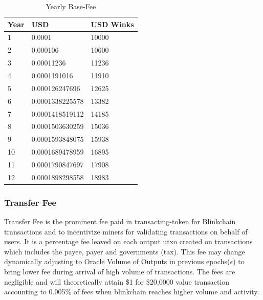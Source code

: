\documentclass[letterpaper,11pt]{article}
\begin{document}
\begin{table}[!ht]
    \centering
    \begin{tabular}{|l|l|l|}
    \hline
        Year & USD  & USD Winks \\ \hline
        1 & 0.0001 & 10000 \\ 
        2 & 0.000106 & 10600 \\ 
        3 & 0.00011236 & 11236 \\ 
        4 & 0.0001191016 & 11910 \\  
        5 & 0.000126247696 & 12625 \\ 
        6 & 0.0001338225578 & 13382 \\ 
        7 & 0.0001418519112 & 14185 \\ 
        8 & 0.0001503630259 & 15036 \\ 
        9 & 0.0001593848075 & 15938 \\ 
        10 & 0.0001689478959 & 16895 \\ 
        11 & 0.0001790847697 & 17908 \\ 
        12 & 0.0001898298558 & 18983 \\ \hline
    \end{tabular}
    \caption{Yearly Base-Fee}
\end{table}

\subsubsection{Transfer Fee}

Transfer Fee is the prominent fee paid in transacting-token for Blinkchain transactions and to incentivize miners for validating transactions on behalf of users. It is a percentage fee leaved on each output utxo created on transactions which includes the payee, payer and governments (tax). This fee may change dynamically adjusting to Oracle Volume of Outputs in previous epochs($\epsilon$) to bring lower fee during arrival of high volume of transactions. The fees are negligible and will theoretically attain \$1 for \$20,0000 value transaction accounting to 0.005\% of fees when blinkchain reaches higher volume and activity.\\

\end{document}
